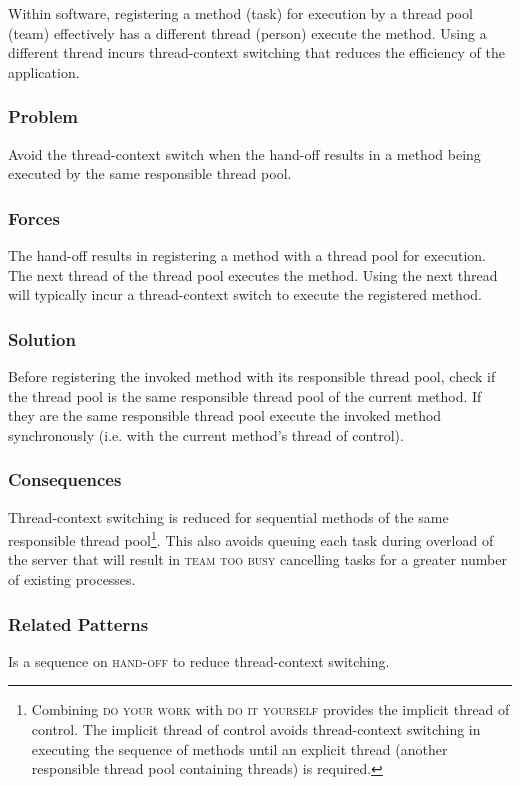 \documentclass[prodmode]{style/acmlarge}
\begin{document}
Within software, registering a method (task) for execution by a thread pool
(team) effectively has a different thread (person) execute the method.  Using a
different thread incurs thread-context switching that reduces the efficiency of
the application.

\subsubsection*{\textbf{Problem}} Avoid the thread-context switch when the hand-off
results in a method being executed by the same responsible thread pool.

\subsubsection*{Forces} The hand-off results in registering a method with a
thread pool for execution.  The next thread of the thread pool executes the
method.  Using the next thread will typically incur a thread-context switch to
execute the registered method.

\subsubsection*{\textbf{Solution}} Before registering the invoked method with its
responsible thread pool, check if the thread pool is the same responsible thread
pool of the current method.  If they are the same responsible thread pool
execute the invoked method synchronously (i.e. with the current method's thread
of control).

\subsubsection*{Consequences} Thread-context switching is reduced for sequential
methods of the same responsible thread pool\footnote{Combining \textsc{do your
work} with \textsc{do it yourself} provides the implicit thread of control.  The
implicit thread of control avoids thread-context switching in executing the
sequence of methods until an explicit thread (another responsible thread pool
containing threads) is required.}.  This also avoids queuing each task during
overload of the server that will result in \textsc{team too busy} cancelling
tasks for a greater number of existing processes.

\subsubsection*{Related Patterns} Is a sequence on \textsc{hand-off} to reduce
thread-context switching.
\end{document}
